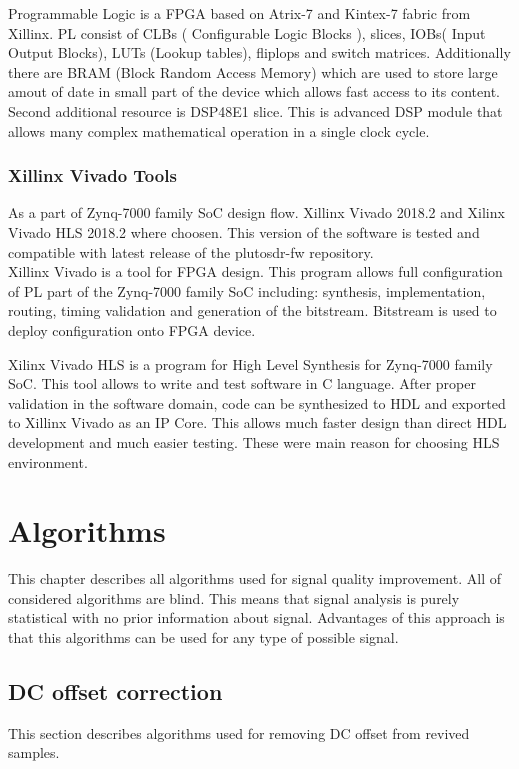 \documentclass[en,printmode]{mgr}
\begin{document}
		Programmable Logic is a FPGA based on Atrix-7 and Kintex-7 fabric from Xillinx. PL consist of
		CLBs ( Configurable Logic Blocks ), slices, IOBs( Input Output Blocks), LUTs (Lookup tables),
		fliplops and switch matrices. Additionally there are BRAM (Block Random Access Memory) which
		are used to store large amout of date in small part of the device which allows fast access to
		its content. Second additional resource is DSP48E1 slice. This is advanced DSP module that
		allows many complex mathematical operation in a single clock cycle.
		
		\subsection*{Xillinx Vivado Tools}
			As a part of Zynq-7000 family SoC design flow. Xillinx Vivado 2018.2 and Xilinx Vivado HLS
			2018.2 where choosen. This version of the software is tested and compatible with latest
			release of the plutosdr-fw repository.
			\\
			
			Xillinx Vivado is a tool for FPGA design. This program allows full configuration of
			PL part of the Zynq-7000 family SoC including: synthesis, implementation, routing,
			timing validation and generation of the bitstream. Bitstream is used to deploy configuration
			onto FPGA device.
			
			Xilinx Vivado HLS is a program for High Level Synthesis for Zynq-7000 family SoC. This 
			tool allows to write and test software in C language. After proper validation in the software
			domain, code can be synthesized to HDL and exported to Xillinx Vivado as an IP Core.
			This allows much faster design than direct HDL development and much easier testing.
			These were main reason for choosing HLS environment.
	
\chapter{Algorithms}
	This chapter describes all algorithms used for signal quality improvement. All of considered 
	algorithms are blind. This means that signal analysis is purely statistical with no prior 
	information about signal. Advantages of this approach is that this algorithms can be used 
	for any type of possible signal.
	\section{DC offset correction}
		This section describes algorithms used for removing DC offset from revived samples.
\end{document}
